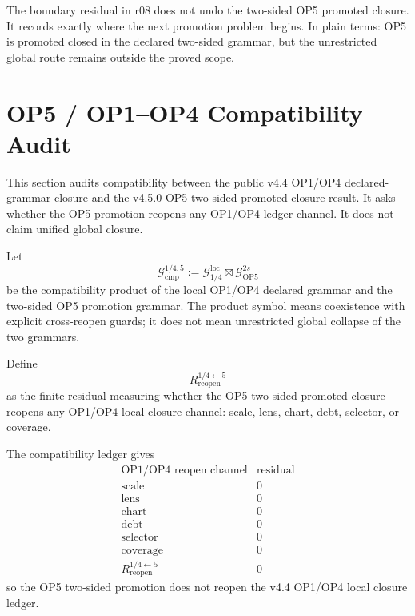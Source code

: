 \begin{remark}[Interpretation]
The boundary residual in r08 does not undo the two-sided OP5 promoted closure.
It records exactly where the next promotion problem begins.  In plain terms:
OP5 is promoted closed in the declared two-sided grammar, but the unrestricted
global route remains outside the proved scope.
\end{remark}



\section{OP5 / OP1--OP4 Compatibility Audit}
\label{sec:v450-r09-op5-op14-compatibility-audit}

This section audits compatibility between the public v4.4 OP1/OP4
declared-grammar closure and the v4.5.0 OP5 two-sided promoted-closure result.
It asks whether the OP5 promotion reopens any OP1/OP4 ledger channel.  It does
not claim unified global closure.

\begin{definition}
Let
\[
    \mathcal G_{\mathrm{cmp}}^{1/4,5}
    :=
    \mathcal G_{1/4}^{\mathrm{loc}}
    \boxtimes
    \mathcal G_{\mathrm{OP5}}^{2s}
\]
be the compatibility product of the local OP1/OP4 declared grammar and the
two-sided OP5 promotion grammar.  The product symbol means coexistence with
explicit cross-reopen guards; it does not mean unrestricted global collapse of
the two grammars.
\end{definition}

\begin{definition}
Define
\[
    R_{\mathrm{reopen}}^{1/4\leftarrow 5}
\]
as the finite residual measuring whether the OP5 two-sided promoted closure
reopens any OP1/OP4 local closure channel: scale, lens, chart, debt, selector,
or coverage.
\end{definition}

\begin{proposition}
The compatibility ledger gives
\[
\begin{array}{c|r}
\text{OP1/OP4 reopen channel} & \text{residual}\\
\hline
\text{scale} & 0\\
\text{lens} & 0\\
\text{chart} & 0\\
\text{debt} & 0\\
\text{selector} & 0\\
\text{coverage} & 0\\
\hline
R_{\mathrm{reopen}}^{1/4\leftarrow 5} & 0
\end{array}
\]
so the OP5 two-sided promotion does not reopen the v4.4 OP1/OP4 local closure
ledger.
\end{proposition}

